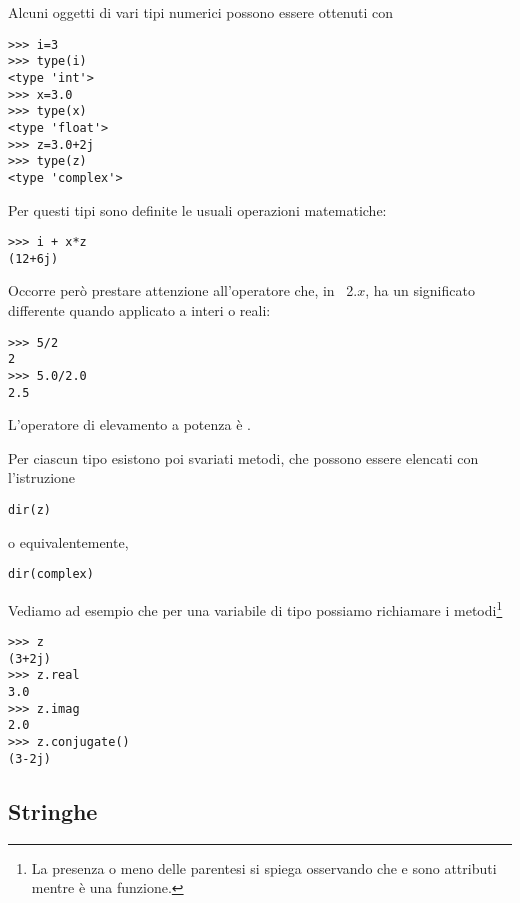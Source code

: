 Alcuni oggetti di vari tipi numerici possono essere ottenuti con
\begin{verbatim}
>>> i=3
>>> type(i)
<type 'int'>
>>> x=3.0
>>> type(x)
<type 'float'>
>>> z=3.0+2j
>>> type(z)
<type 'complex'>
\end{verbatim}
Per questi tipi sono definite le usuali operazioni matematiche:
\begin{verbatim}
>>> i + x*z
(12+6j)
\end{verbatim}
Occorre per\`o prestare attenzione all'operatore \istr{/} che, in \python\
2.$x$, ha un significato differente quando applicato a interi o reali:
\begin{verbatim}
>>> 5/2
2
>>> 5.0/2.0
2.5
\end{verbatim}
L'operatore di elevamento a potenza \`e \istr{**}.

Per ciascun tipo esistono poi svariati metodi, che possono essere elencati con
l'istruzione \istr{dir}
\begin{verbatim}
dir(z)
\end{verbatim}
o equivalentemente,
\begin{verbatim}
dir(complex)
\end{verbatim}
Vediamo ad esempio che per una variabile di tipo  possiamo
richiamare i metodi\footnote{La presenza o meno delle parentesi si spiega
osservando che \istr{real} e \istr{imag} sono attributi mentre 
\`e una funzione.}
\begin{verbatim}
>>> z
(3+2j)
>>> z.real
3.0
>>> z.imag
2.0
>>> z.conjugate()
(3-2j)
\end{verbatim}

\subsection{Stringhe}

